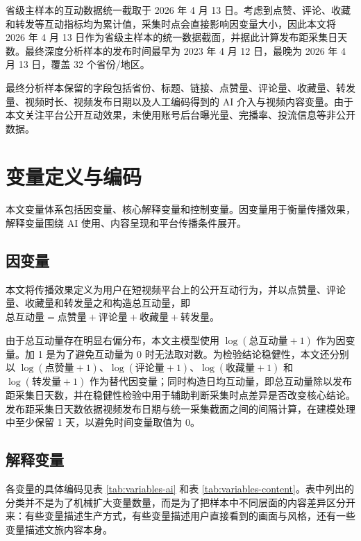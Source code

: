 省级主样本的互动数据统一截取于 2026 年 4 月 13 日。考虑到点赞、评论、收藏和转发等互动指标均为累计值，采集时点会直接影响因变量大小，因此本文将 2026 年 4 月 13 日作为省级主样本的统一数据截面，并据此计算发布距采集日天数。最终深度分析样本的发布时间最早为 2023 年 4 月 12 日，最晚为 2026 年 4 月 13 日，覆盖 32 个省份/地区。

最终分析样本保留的字段包括省份、标题、链接、点赞量、评论量、收藏量、转发量、视频时长、视频发布日期以及人工编码得到的 AI 介入与视频内容变量。由于本文关注平台公开互动效果，未使用账号后台曝光量、完播率、投流信息等非公开数据。

\section{变量定义与编码}

本文变量体系包括因变量、核心解释变量和控制变量。因变量用于衡量传播效果，解释变量围绕 AI 使用、内容呈现和平台传播条件展开。

\subsection{因变量}

本文将传播效果定义为用户在短视频平台上的公开互动行为，并以点赞量、评论量、收藏量和转发量之和构造总互动量，即 $\text{总互动量}=\text{点赞量}+\text{评论量}+\text{收藏量}+\text{转发量}$。

由于总互动量存在明显右偏分布，本文主模型使用 $\log(\text{总互动量}+1)$ 作为因变量。加 1 是为了避免互动量为 0 时无法取对数。为检验结论稳健性，本文还分别以 $\log(\text{点赞量}+1)$、$\log(\text{评论量}+1)$、$\log(\text{收藏量}+1)$ 和 $\log(\text{转发量}+1)$ 作为替代因变量；同时构造日均互动量，即总互动量除以发布距采集日天数，并在稳健性检验中用于辅助判断采集时点差异是否改变核心结论。发布距采集日天数依据视频发布日期与统一采集截面之间的间隔计算，在建模处理中至少保留 1 天，以避免时间变量取值为 0。

\subsection{解释变量}

各变量的具体编码见表 \ref{tab:variables-ai} 和表 \ref{tab:variables-content}。表中列出的分类并不是为了机械扩大变量数量，而是为了把样本中不同层面的内容差异区分开来：有些变量描述生产方式，有些变量描述用户直接看到的画面与风格，还有一些变量描述文旅内容本身。

